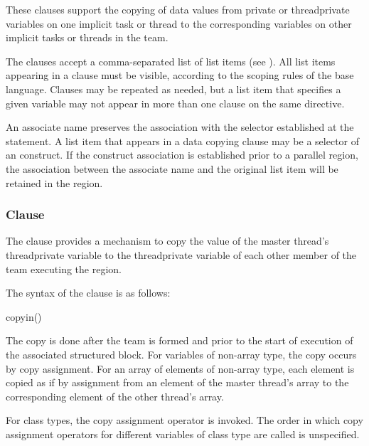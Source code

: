 These clauses support the copying of data values from private or threadprivate variables 
on one implicit task or thread to the corresponding variables on other implicit tasks or 
threads in the team.

The clauses accept a comma-separated list of list items (see ). 
All list items appearing in a clause must be visible, according to the scoping rules of the 
base language. Clauses may be repeated as needed, but a list item that specifies a given 
variable may not appear in more than one clause on the same directive.

\fortranspecificstart
An associate name preserves the association with the selector established at the  statement. A list item that appears in a data copying clause may be a selector of an  construct. If the construct association is established prior to a parallel region, the association between the associate name and the original list item will be retained in the region.
\fortranspecificend







\subsubsection{ Clause}
\label{subsubsec:copyin clause}
\summary
The  clause provides a mechanism to copy the value of the master thread’s 
threadprivate variable to the threadprivate variable of each other member of the team 
executing the  region. 

\syntax
The syntax of the  clause is as follows:

\begin{boxedcode}
copyin()
\end{boxedcode}

\descr
\ccppspecificstart
The copy is done after the team is formed and prior to the start of execution of the 
associated structured block. For variables of non-array type, the copy occurs by copy 
assignment. For an array of elements of non-array type, each element is copied as if by 
assignment from an element of the master thread’s array to the corresponding element of 
the other thread’s array. 
\ccppspecificend

\cppspecificstart
For class types, the copy assignment operator is invoked. The order in which copy 
assignment operators for different variables of class type are called is unspecified. 
\cppspecificend

